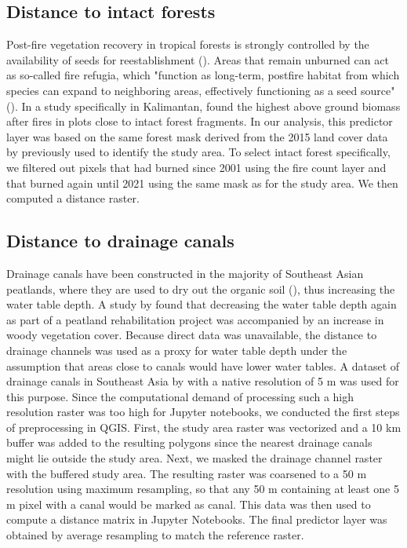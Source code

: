 \documentclass[
  fontsize=12pt,
  paper=a4,
  parskip=half,
  headings=big,
  DIV=12
]{scrreprt}
\begin{document}
\subsection{Distance to intact forests}

Post-fire vegetation recovery in tropical forests is strongly controlled by the availability of seeds for reestablishment (\cite{cury_effects_2020}). Areas that remain unburned can act as so-called fire refugia, which "function as long-term, postfire habitat from which species can expand to neighboring areas, effectively functioning as a seed source" (\cite{meddens_fire_2018}). In a study specifically in Kalimantan, \textcite{hoscilo_development_2008} found the highest above ground biomass after fires in plots close to intact forest fragments. In our analysis, this predictor layer was based on the same forest mask derived from the 2015 land cover data by \textcite{li_improved_2023} previously used to identify the study area. To select intact forest specifically, we filtered out pixels that had burned since 2001 using the fire count layer and that burned again until 2021 using the same mask as for the study area. We then computed a distance raster.

\subsection{Distance to drainage canals}

Drainage canals have been constructed in the majority of Southeast Asian peatlands, where they are used to dry out the organic soil (\cite{dadap_drainage_2021}), thus increasing the water table depth. A study by \textcite{giesen_roles_2023} found that decreasing the water table depth again as part of a peatland rehabilitation project was accompanied by an increase in woody vegetation cover. Because direct data was unavailable, the distance to drainage channels was used as a proxy for water table depth under the assumption that areas close to canals would have lower water tables. A dataset of drainage canals in Southeast Asia by \textcite{dadap_drainage_2021} with a native resolution of 5 m was used for this purpose. Since the computational demand of processing such a high resolution raster was too high for Jupyter notebooks, we conducted the first steps of preprocessing in QGIS. First, the study area raster was vectorized and a 10 km buffer was added to the resulting polygons since the nearest drainage canals might lie outside the study area. Next, we masked the drainage channel raster with the buffered study area. The resulting raster was coarsened to a 50 m resolution using maximum resampling, so that any 50 m containing at least one 5 m pixel with a canal would be marked as canal. This data was then used to compute a distance matrix in Jupyter Notebooks. The final predictor layer was obtained by average resampling to match the reference raster.
\end{document}

